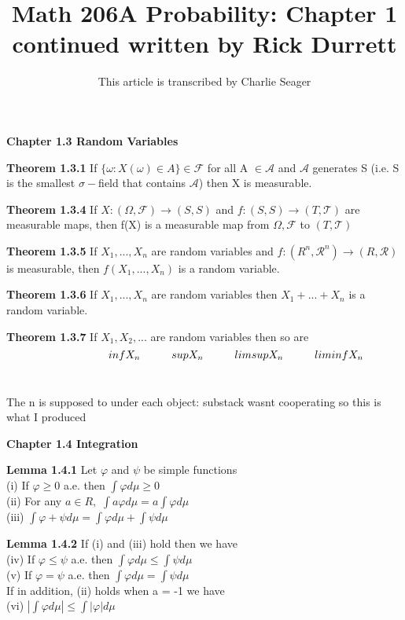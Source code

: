 \documentclass{article}
\newcommand\tab[1][1cm]{\hspace*{#1}}
\begin{document}
\title{Math 206A Probability: Chapter 1 continued written by Rick Durrett}
\author{This article is transcribed by Charlie Seager}

\maketitle

\textbf {Chapter 1.3 Random Variables}

\textbf {Theorem 1.3.1} If $\{ \omega : X(\omega) \in A \} \in \mathcal{F}$ for all A $\in \mathcal{A}$ and $\mathcal{A}$ generates S (i.e. S is the smallest $\sigma -$field that contains $\mathcal{A}$) then X is measurable.

\textbf {Theorem 1.3.4} If $X : (\Omega, \mathcal{F}) \rightarrow (S,S)$ and $f : (S,S) \rightarrow (T, \mathcal{T})$ are measurable maps, then f(X) is a measurable map from $\Omega, \mathcal{F}$ to $(T, \mathcal{T})$

\textbf {Theorem 1.3.5} If $X_1 ,..., X_n$ are random variables and $f : (R^n, \mathcal{R}^n) \rightarrow (R, \mathcal{R})$ is measurable, then $f(X_1 ,..., X_n)$ is a random variable.

\textbf {Theorem 1.3.6} If $X_1 ,..., X_n$ are random variables then $X_1 + ... + X_n$ is a random variable.

\textbf {Theorem 1.3.7} If $X_1, X_2,...$ are random variables then so are
\\
\[
\tab \tab {inf X_{n}} \tab {sup X_n} \tab {lim sup X_n} \tab {lim inf X_n} 
\]
\\
\tab \tab {  n} \tab {  n  } \tab {   n   } \tab {    n}

The n is supposed to under each object: substack wasnt cooperating so this is what I produced

\textbf {Chapter 1.4 Integration}

\textbf {Lemma 1.4.1} Let $\varphi$ and $\psi$ be simple functions
\\
(i) If $\varphi \geq 0$ a.e. then $\int \varphi d \mu \geq 0$
\\
(ii) For any $a \in R,$ $\int a\varphi d\mu = a \int \varphi d\mu$ \\
(iii) $\int \varphi + \psi d\mu = \int \varphi d\mu + \int \psi d\mu$

\textbf {Lemma 1.4.2} If (i) and (iii) hold then we have \\
(iv) If $\varphi \leq \psi$ a.e. then $\int \varphi d\mu \leq \int \psi d\mu$ \\
(v) If $\varphi = \psi$ a.e. then $\int \varphi d\mu = \int \psi d\mu$ \\
If in addition, (ii) holds when a = -1 we have \\
(vi) $|\int \varphi d\mu | \leq \int |\varphi| d\mu$
\end{document}
